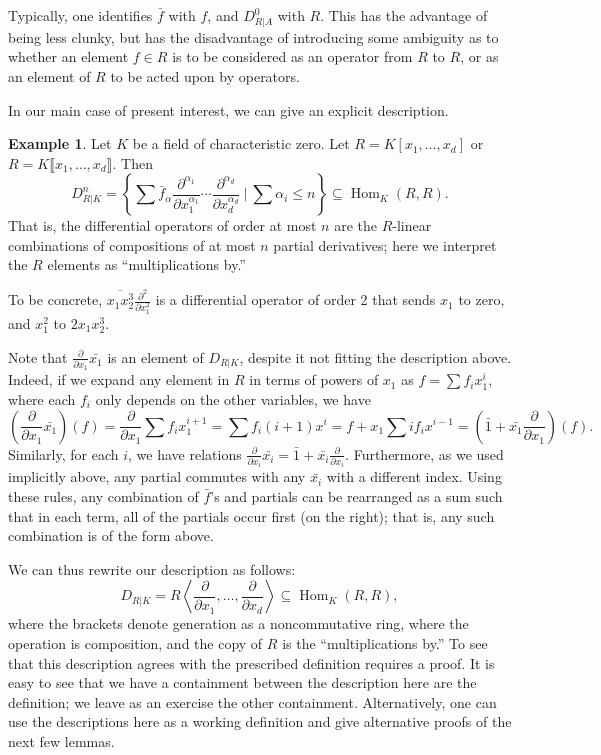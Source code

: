\documentclass[11pt]{book}
\numberwithin{equation}{section}
\numberwithin{theorem}{chapter}
\theoremstyle{definition}
\newtheorem{example}[theorem]{Example}
\newtheorem*{basic properties}{Basic Properties}
\newtheorem*{Important Remark}{Important Remark}
\theoremstyle{remark}
\newcommand{\Hom}{\operatorname{Hom}}
\begin{document}
Typically, one identifies $\bar{f}$ with $f$, and $D^0_{R|A}$ with $R$. This has the advantage of being less clunky, but has the disadvantage of introducing some ambiguity as to whether an element $f\in R$ is to be considered as an operator from $R$ to $R$, or as an element of $R$ to be acted upon by operators.

In our main case of present interest, we can give an explicit description.

\begin{example} Let $K$ be a field of characteristic zero. Let $R=K[x_1,\dots,x_d]$ or $R=K\llbracket x_1,\dots, x_d\rrbracket$. Then 
	\[ D^n_{R|K}= \left\{ \sum \bar{f}_\alpha \frac{\partial^{\alpha_1}}{\partial x_1^{\alpha_1}}\cdots \frac{\partial^{\alpha_d}}{\partial x_d^{\alpha_d}} \ \Big| \ \sum{\alpha_i} \leq n \right\} \subseteq \Hom_K(R,R). \]
That is, the differential operators of order at most $n$ are the $R$-linear combinations of compositions of at most $n$ partial derivatives; here we interpret the $R$ elements as ``multiplications by.''

To be concrete, $\overline{x_1 x_2^3} \frac{\partial^2}{\partial x_1^2}$ is a differential operator of order 2 that sends $x_1$ to zero, and $x_1^2$ to $2 x_1 x_2^3$.

Note that $\frac{\partial}{\partial x_1} \bar{x_1}$ is an element of $D_{R|K}$, despite it not fitting the description above. Indeed, if we expand any element in $R$ in terms of powers of $x_1$ as $f=\sum f_i x_1^i$, where each $f_i$ only depends on the other variables, we have 
\[\left(\frac{\partial}{\partial x_1} \bar{x_1}\right) (f) = \frac{\partial}{\partial x_1} \sum f_i x_1^{i+1} = \sum f_i (i+1) x^i = f + x_1 \sum i f_i x^{i-1} = \left(\bar{1} + \bar{x_1} \frac{\partial}{\partial x_1}\right)(f). \]
Similarly, for each $i$, we have relations $\frac{\partial}{\partial x_i} \bar{x_i}=\bar{1} + \bar{x_i} \frac{\partial}{\partial x_i}$. Furthermore, as we used implicitly above, any partial commutes with any $\bar{x_i}$ with a different index. Using these rules, any combination of $\bar{f}$'s and partials can be rearranged as a sum such that in each term, all of the partials occur first (on the right); that is, any such combination is of the form above.

We can thus rewrite our description as follows:
\[ D_{R|K}= R\left\langle \frac{\partial}{\partial x_1}, \dots, \frac{\partial}{\partial x_d} \right\rangle \subseteq \Hom_K(R,R), \]
where the brackets denote generation as a noncommutative ring, where the operation is composition, and the copy of $R$ is the ``multiplications by.''
To see that this description agrees with the prescribed definition requires a proof. It is easy to see that we have a containment between the description here are the definition; we leave as an exercise the other containment. Alternatively, one can use the descriptions here as a working definition and give alternative proofs of the next few lemmas.
\end{example}
\end{document}
